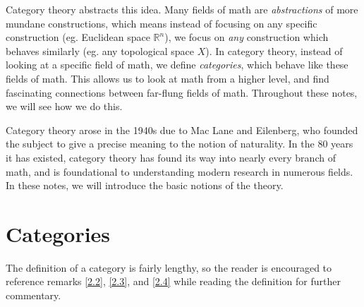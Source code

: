 \documentclass[11pt, A4]{article}
\begin{document}
Category theory abstracts this idea. Many fields of math are \emph{abstractions} of more mundane constructions, which means instead of focusing on any specific construction (eg. Euclidean space $\mathbb{R} ^n$), we focus on \emph{any} construction which behaves similarly (eg. any topological space $X$). In category theory, instead of looking at a specific field of math, we define \emph{categories}, which behave like these fields of math. This allows us to look at math from a higher level, and find fascinating connections between far-flung fields of math. Throughout these notes, we will see how we do this.

Category theory arose in the 1940s due to Mac Lane and Eilenberg, who founded the subject to give a precise meaning to the notion of naturality. In the 80 years it has existed, category theory has found its way into nearly every branch of math, and is foundational to understanding modern research in numerous fields. In these notes, we will introduce the basic notions of the theory.

\section{Categories}

The definition of a category is fairly lengthy, so the reader is encouraged to reference remarks \ref{2.2}, \ref{2.3}, and \ref{2.4} while reading the definition for further commentary.
\end{document}
